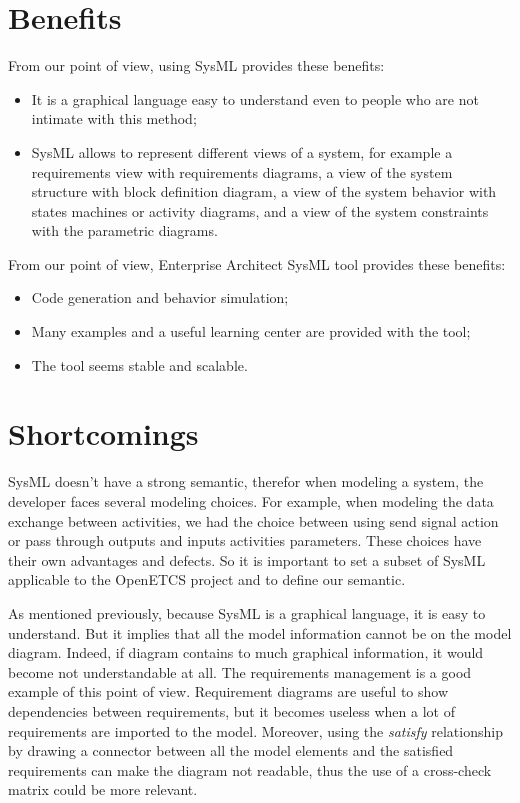 \documentclass{template/openetcs_report}
\begin{document}
\section{Benefits}

From our point of view, using SysML provides these benefits:

\begin{itemize}
\item It is a graphical language easy to understand even to people who are not intimate with this method;
\item SysML allows to represent different views of a system, for example a requirements view with requirements diagrams, a view of the system structure with block definition diagram, a view of the system behavior with states machines or activity diagrams, and a view of the system constraints with the parametric diagrams.
\end{itemize}

From our point of view, Enterprise Architect SysML tool provides these benefits:

\begin{itemize}
\item Code generation and behavior simulation;
\item Many examples and a useful learning center are provided with the tool;
\item The tool seems stable and scalable.
\end{itemize}

\section{Shortcomings}
SysML doesn't have a strong semantic, therefor when modeling a system, the developer faces several modeling choices. For example, when modeling the data exchange between activities, we had the choice between using send signal action or pass through outputs and inputs activities parameters. These choices have their own advantages and defects. So it is important to set a subset of SysML applicable to the OpenETCS project and to define our semantic.

As mentioned previously, because SysML is a graphical language, it is easy to understand. But it implies that all the model information cannot be on the model diagram. Indeed, if diagram contains to much graphical information, it would become not understandable at all. The requirements management is a good example of this point of view. Requirement diagrams are useful to show dependencies between requirements, but it becomes useless when a lot of requirements are imported to the model. Moreover, using the \emph{satisfy} relationship by drawing a connector between all the model elements and the satisfied requirements can make the diagram not readable, thus the use of a cross-check matrix could be more relevant.
\end{document}
